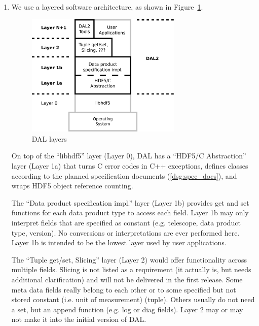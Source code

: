 \documentclass[a4paper,11pt]{article}
\begin{document}
\begin{enumerate}[label=\it D.\arabic{*}]
\item \label{dsg:layers} We use a layered software architecture, as shown in Figure~\ref{fig:layers}.\\

\begin{figure}[htb!]
\centering
\includegraphics[width=0.70\textwidth]{Reqs_DD_layers.pdf}
\caption{DAL layers}
\label{fig:layers}	%
\end{figure}

On top of the ``libhdf5'' layer (Layer 0), DAL has a ``HDF5/C Abstraction'' layer (Layer 1a) that turns C error codes in C++ exceptions, defines classes according to the planned specification documents (\ref{dsg:spec_docs}), and wraps HDF5 object reference counting.

The ``Data product specification impl.'' layer (Layer 1b) provides get and set functions for each data product type to access each field.
Layer 1b may only interpret fields that are specified as constant (e.g. telescope, data product type, version).
No conversions or interpretations are ever performed here.
Layer 1b is intended to be the lowest layer used by user applications.

The ``Tuple get/set, Slicing'' layer (Layer 2) would offer functionality across multiple fields.
Slicing is not listed as a requirement (it actually is, but needs additional clarification) and will not be delivered in the first release.
Some meta data fields really belong to each other or to some specified but not stored constant (i.e. unit of measurement) (tuple).
Others usually do not need a set, but an append function (e.g. log or diag fields).
Layer 2 may or may not make it into the initial version of DAL.


\end{enumerate}
\end{document}
